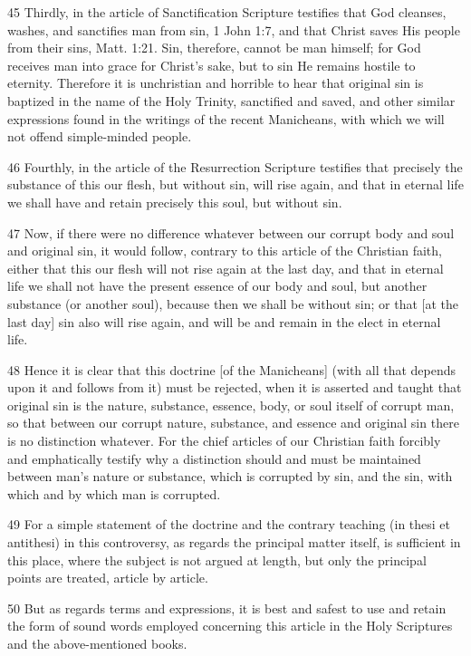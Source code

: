 45 Thirdly, in the article of Sanctification Scripture testifies that God cleanses, washes, and sanctifies man from sin, 1 John 1:7, and that Christ saves His people from their sins, Matt. 1:21. Sin, therefore, cannot be man himself; for God receives man into grace for Christ’s sake, but to sin He remains hostile to eternity. Therefore it is unchristian and horrible to hear that original sin is baptized in the name of the Holy Trinity, sanctified and saved, and other similar expressions found in the writings of the recent Manicheans, with which we will not offend simple-minded people.

46 Fourthly, in the article of the Resurrection Scripture testifies that precisely the substance of this our flesh, but without sin, will rise again, and that in eternal life we shall have and retain precisely this soul, but without sin.

47 Now, if there were no difference whatever between our corrupt body and soul and original sin, it would follow, contrary to this article of the Christian faith, either that this our flesh will not rise again at the last day, and that in eternal life we shall not have the present essence of our body and soul, but another substance (or another soul), because then we shall be without sin; or that [at the last day] sin also will rise again, and will be and remain in the elect in eternal life.

48 Hence it is clear that this doctrine [of the Manicheans] (with all that depends upon it and follows from it) must be rejected, when it is asserted and taught that original sin is the nature, substance, essence, body, or soul itself of corrupt man, so that between our corrupt nature, substance, and essence and original sin there is no distinction whatever. For the chief articles of our Christian faith forcibly and emphatically testify why a distinction should and must be maintained between man’s nature or substance, which is corrupted by sin, and the sin, with which and by which man is corrupted.

49 For a simple statement of the doctrine and the contrary teaching (in thesi et antithesi) in this controversy, as regards the principal matter itself, is sufficient in this place, where the subject is not argued at length, but only the principal points are treated, article by article.

50 But as regards terms and expressions, it is best and safest to use and retain the form of sound words employed concerning this article in the Holy Scriptures and the above-mentioned books.

